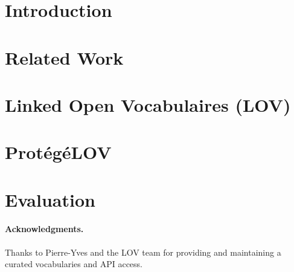 \documentclass[runningheads,a4paper]{llncs}
\begin{document}
\vspace{-3mm}
\section{Introduction}\label{sec:introduction}




\vspace{-3mm}
\section{Related Work}\label{sec:soa}
\vspace{-3mm}



\vspace{-3mm}
\section{Linked Open Vocabulaires (LOV)}\label{sec:lov}
\vspace{-3mm}




\vspace{-3mm}
\section{Prot{\'e}g{\'e}LOV}\label{sec:classification}



\vspace{-3mm}
\section{Evaluation}\label{sec:conclusion}




\vspace{-1mm}
\paragraph{\textbf{Acknowledgments.}} %
Thanks to Pierre-Yves and the LOV team for providing and maintaining a curated vocabularies and API access.
\vspace{-3mm}


\end{document}
